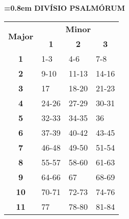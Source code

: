 \documentclass[twoside,10pt]{article}
\begin{document}
\newpage
\pagestyle{myheadings}
\setcounter{page}{1}

{
  {
    \begin{center}
    {\bfseries{}\font=0.8em DIVÍSIO PSALMÓRUM}
    \end{center}
  }

  {
    \begin{table}[ht]
    \centering
    \begin{tabular}{|cccc|}
    \hline
    \multicolumn{1}{|c|}{\multirow{2}{*}{\textbf{Major}}} & \multicolumn{3}{c|}{\textbf{Minor}}   \\ \cline{2-4}
    \multicolumn{1}{|c|}{}   & \multicolumn{1}{c|}{\textbf{1}} & \multicolumn{1}{c|}{\textbf{2}} & \multicolumn{1}{c|}{\textbf{3}} \\ \hline
    \multicolumn{1}{|c|}{\textbf{1}}  & \multicolumn{1}{l|}{1-3} & \multicolumn{1}{l|}{4-6} & \multicolumn{1}{l|}{7-8} \\ \hline
    \multicolumn{1}{|c|}{\textbf{2}}  & \multicolumn{1}{l|}{9-10} & \multicolumn{1}{l|}{11-13} & \multicolumn{1}{l|}{14-16} \\ \hline
    \multicolumn{1}{|c|}{\textbf{3}}  & \multicolumn{1}{l|}{17} & \multicolumn{1}{l|}{18-20} & \multicolumn{1}{l|}{21-23} \\ \hline
    \multicolumn{1}{|c|}{\textbf{4}}  & \multicolumn{1}{l|}{24-26} & \multicolumn{1}{l|}{27-29} & \multicolumn{1}{l|}{30-31} \\ \hline
    \multicolumn{1}{|c|}{\textbf{5}}  & \multicolumn{1}{l|}{32-33} & \multicolumn{1}{l|}{34-35} & \multicolumn{1}{l|}{36} \\ \hline
    \multicolumn{1}{|c|}{\textbf{6}}  & \multicolumn{1}{l|}{37-39} & \multicolumn{1}{l|}{40-42} & \multicolumn{1}{l|}{43-45} \\ \hline
    \multicolumn{1}{|c|}{\textbf{7}}  & \multicolumn{1}{l|}{46-48} & \multicolumn{1}{l|}{49-50} & \multicolumn{1}{l|}{51-54} \\ \hline
    \multicolumn{1}{|c|}{\textbf{8}}  & \multicolumn{1}{l|}{55-57} & \multicolumn{1}{l|}{58-60} & \multicolumn{1}{l|}{61-63} \\ \hline
    \multicolumn{1}{|c|}{\textbf{9}}  & \multicolumn{1}{l|}{64-66} & \multicolumn{1}{l|}{67} & \multicolumn{1}{l|}{68-69} \\ \hline
    \multicolumn{1}{|c|}{\textbf{10}} & \multicolumn{1}{l|}{70-71} & \multicolumn{1}{l|}{72-73} & \multicolumn{1}{l|}{74-76} \\ \hline
    \multicolumn{1}{|c|}{\textbf{11}} & \multicolumn{1}{l|}{77} & \multicolumn{1}{l|}{78-80} & \multicolumn{1}{l|}{81-84} \\ \hline

\end{tabular}
\end{table}}}
\end{document}
